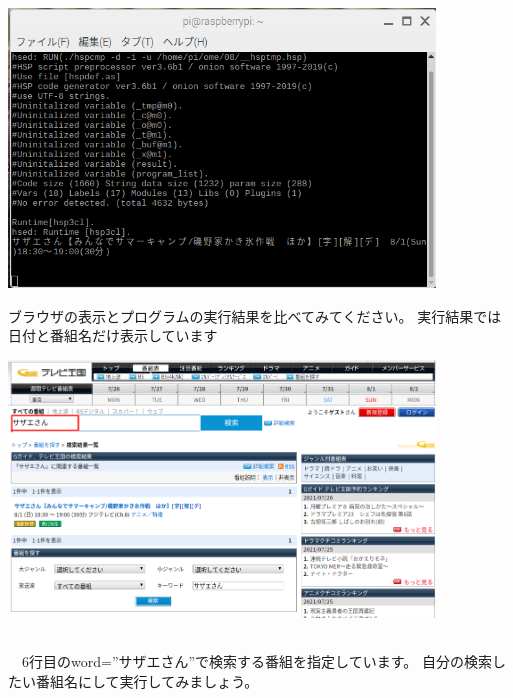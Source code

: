 \begin{center}
\includegraphics[width=0.85\textwidth]{./text08-img/textbook-img044.png}

\end{center}

\bigskip



ブラウザの表示とプログラムの実行結果を比べてみてください。
実行結果では日付と番組名だけ表示しています

\begin{center}
\includegraphics[width=0.85\textwidth]{./text08-img/textbook-img042.png}

\end{center}


\bigskip


\bigskip

\subsection*{}
\subsection*{\theQuestion\label{Q:TV}}
\ \ 6行目のword=”サザエさん”で検索する番組を指定しています。
自分の検索したい番組名にして実行してみましょう。

